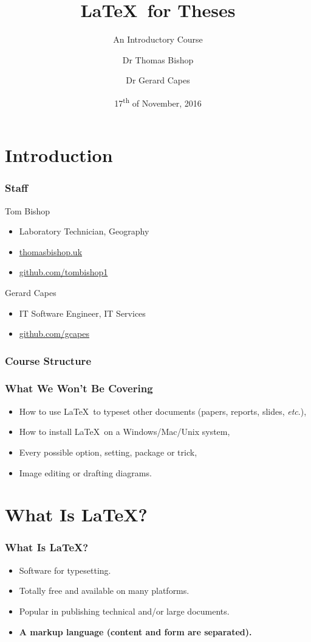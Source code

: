 \documentclass{beamer}
\title{\LaTeX \ for Theses}
\subtitle{An Introductory Course}
\author{Dr Thomas Bishop \and Dr Gerard Capes}
\institute{University of Manchester}
\date{17\textsuperscript{th} of November, 2016}
\begin{document}
\begin{frame}
	\titlepage
\end{frame}

\section{Introduction}

\begin{frame} \frametitle{Staff}
	\begin{block}{Tom Bishop}
			\begin{itemize}
				\item Laboratory Technician, Geography
					\item \url{thomasbishop.uk}
					\item \url{github.com/tombishop1}
			\end{itemize}
		\end{block}
	\begin{block}{Gerard Capes}
		\begin{itemize}
			\item IT Software Engineer, IT Services
			\item \url{github.com/gcapes}
		\end{itemize}
	\end{block}
\end{frame}

\begin{frame}
	\frametitle{Course Structure}
	\tableofcontents
\end{frame}

\begin{frame} \frametitle{What We \textbf{Won't} Be Covering}
	\begin{itemize}
		\item How to use \LaTeX \ to typeset other documents (papers, reports, slides, \textit{etc}.),
		\item How to install \LaTeX \ on a Windows/Mac/Unix system,
		\item Every possible option, setting, package or trick,
		\item Image editing or drafting diagrams.
	\end{itemize}
\end{frame}

\section{What Is \LaTeX?}

\begin{frame} \frametitle{What Is \LaTeX?}
	\begin{itemize}
		\item Software for typesetting.
		\item Totally free and available on many platforms.
		\item Popular in publishing technical and/or large documents.
		\item \textbf{A markup language (content and form are separated).}
	\end{itemize}
\end{frame}
\end{document}
